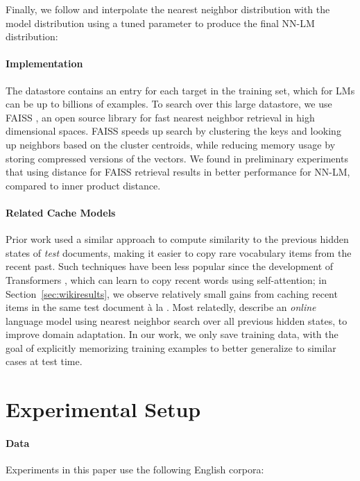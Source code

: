 \documentclass{article} \usepackage{iclr2020_conference,times}
\begin{document}
Finally, we follow \citet{grave2017unbounded} and interpolate the nearest neighbor distribution  with the model distribution  using a tuned parameter  to produce the final NN-LM distribution:


\paragraph{Implementation}
The datastore contains an entry for each target in the training set, which for LMs can be up to billions of examples.
To search over this large datastore, we use FAISS \citep{johnson2017billion}, an open source library for fast nearest neighbor retrieval in high dimensional spaces.
FAISS speeds up search by clustering the keys and looking up neighbors based on the cluster centroids, while reducing memory usage by storing compressed versions of the vectors. We found in preliminary experiments that using  distance for FAISS retrieval results in better performance for NN-LM,  compared to inner product distance.


\paragraph{Related Cache Models}
Prior work \citep{grave2017improving,merity2017pointer} used a similar approach to compute similarity to the previous hidden states of \emph{test} documents, making it easier to copy rare vocabulary items from the recent past. 
Such techniques have been less popular since the development of Transformers \citep{vaswani2017attention}, which can learn to copy recent words using self-attention; in Section~\ref{sec:wikiresults}, we observe relatively small gains from caching recent items in the same test document \`{a} la \citet{grave2017improving}.
Most relatedly, \citet{grave2017unbounded} describe an \emph{online} language model using nearest neighbor search over all previous hidden states, to improve domain adaptation.
In our work, we only save training data, with the goal of explicitly memorizing training examples to better generalize to similar cases at test time. 


\section{Experimental Setup}
\label{sec:setup}

\paragraph{Data} 
Experiments in this paper use the following English corpora:
\end{document}

